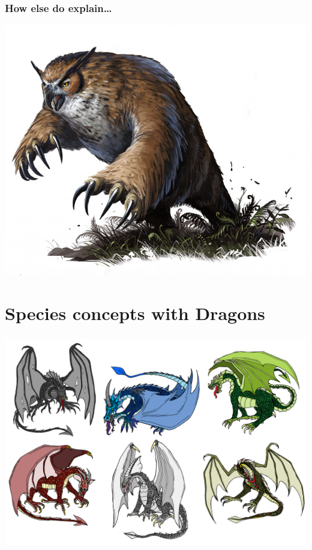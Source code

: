 \documentclass{beamer}\usepackage{graphicx, color}
\begin{document}
\begin{frame}
  \frametitle{How else do explain\dots}
  \includegraphics[width = \textwidth, keepaspectratio = true]{owlbear_1}

\end{frame}


\section{Species concepts with Dragons}
\begin{frame}
  \frametitle{}
  \includegraphics[width = \textwidth, keepaspectratio = true]{chromatic_1}

\end{frame}
\end{document}
